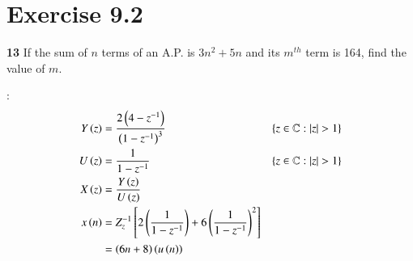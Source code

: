 \documentclass[journal,12pt,twocolumn]{IEEEtran}
\begin{document}


\vspace{3cm}

\title{}
\author{EE23BTECH11054 -  Sai Krishna Shanigarapu$^{*}$
}
\maketitle
\newpage
\bigskip


\section*{Exercise 9.2}

\noindent \textbf{13} \hspace{2pt}If the sum of $n$ terms of an A.P. is $3n^2+5n$ and its $m^{th}$ term is 164, find the value of $m$.
\bigskip

\solution:
\noindent
\begin{align}
Y \left(z\right) &= \frac{2\left(4-z^{-1}\right)}{\left(1-z^{-1}\right)^3} & \left\{z\in\mathbb{C} : |z| > 1\right\}\\
U\left(z\right) &= \frac{1}{1-z^{-1}} & \left\{z\in\mathbb{C} : |z| > 1\right\}\\
X\left(z\right) &=  \frac{Y\left(z\right)}{U\left(z\right)}\\
x\left(n\right) &= Z_{z}^{-1}\left[2\left(\frac{1}{1-z^{-1}}\right) + 6\left(\frac{1}{1-z^{-1}}\right) ^2\right]\\
&= \left(6n+8\right)\left(u\left(n\right)\right)
\end{align}
\end{document}
